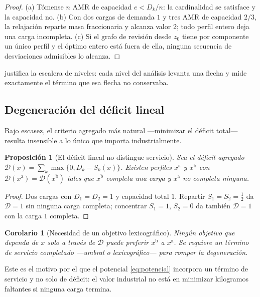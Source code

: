 \documentclass[11pt,a4paper]{article}
\theoremstyle{plain}
\newtheorem{proposicion}[teorema]{Proposición}
\newtheorem{corolario}[teorema]{Corolario}
\theoremstyle{definition}
\theoremstyle{remark}
\begin{document}
\begin{proof}
(a) Tómense $n$ AMR de capacidad $e<D_k/n$: la cardinalidad se satisface y la
capacidad no. (b) Con dos cargas de demanda $1$ y tres AMR de capacidad
$2/3$, la relajación reparte masa fraccionaria y alcanza valor $2$; todo perfil
entero deja una carga incompleta. (c) Si el grafo de revisión desde $z_0$ tiene
por componente un único perfil y el óptimo entero está fuera de ella, ninguna
secuencia de desviaciones admisibles lo alcanza.
\end{proof}

 justifica la escalera de niveles: cada nivel del análisis
levanta una flecha y mide exactamente el término que esa flecha no conservaba.

\subsection{Degeneración del déficit lineal}

Bajo escasez, el criterio agregado más natural —minimizar el déficit total—
resulta insensible a lo único que importa industrialmente.

\begin{proposicion}[El déficit lineal no distingue servicio]
\label{pr:degeneracion}
Sea el déficit agregado $\mathcal D(x)=\sum_k\max\{0,D_k-S_k(x)\}$. Existen
perfiles $x^{\mathrm{a}}$ y $x^{\mathrm{b}}$ con
$\mathcal D(x^{\mathrm{a}})=\mathcal D(x^{\mathrm{b}})$ tales que
$x^{\mathrm{b}}$ completa una carga y $x^{\mathrm{a}}$ no completa ninguna.
\end{proposicion}

\begin{proof}
Dos cargas con $D_1=D_2=1$ y capacidad total $1$. Repartir
$S_1=S_2=\tfrac12$ da $\mathcal D=1$ sin ninguna carga completa; concentrar
$S_1=1$, $S_2=0$ da también $\mathcal D=1$ con la carga $1$ completa.
\end{proof}

\begin{corolario}[Necesidad de un objetivo lexicográfico]
\label{co:lexico}
Ningún objetivo que dependa de $x$ solo a través de $\mathcal D$ puede preferir
$x^{\mathrm{b}}$ a $x^{\mathrm{a}}$. Se requiere un término de servicio
completado —umbral o lexicográfico— para romper la degeneración.
\end{corolario}

Este es el motivo por el que el potencial \eqref{eq:potencial} incorpora un
término de servicio y no solo de déficit: el valor industrial no está en
minimizar kilogramos faltantes si ninguna carga termina.
\end{document}
